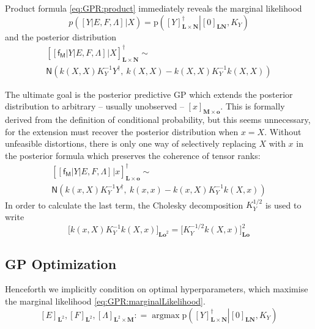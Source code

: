\documentclass[preprint,12pt]{elsarticle}
\newcommand*{\M}[1]{\ensuremath{#1}\xspace}
\newcommand*{\x}{\times}
\newcommand*{\mi}[1]{\mathbf{#1}}
\newcommand*{\rv}[1]{\mathsf{#1}}
\newcommand*{\te}[2][]{\left\lbrack{#2}\right\rbrack_{#1}}
\newcommand*{\tte}[2][]{\lbrack{#2}\rbrack_{#1}}
\newcommand*{\prob}[3]{\M{\mathrm{p}\!\left(\left.{#1}\right\vert{#2,#3}\right)}}
\newcommand*{\deq}{\M{\mathrel{\mathop:}=}}
\newcommand*{\gauss}[2]{\mathsf{N}\!\left({#1,#2}\right)}
\DeclareMathOperator*{\argmax}{argmax}
\begin{document}
        Product formula \cref{eq:GPR:product} immediately reveals the marginal likelihood
        \begin{equation} \label{eq:GPR:marginalLikelihood}
            p\!\left(\te{Y \vert E,F,\Lambda} \big\vert X\right)
            = \prob{\te[\mi{L\x N}]{Y}^{\dagger}}{\te[\mi{LN}]{0}}{K_Y}
        \end{equation}
        and the posterior distribution
        \begin{multline*}
            \te[\mi{L\x N}]{\te{\rv{f_M} \vert Y \vert E,F,\Lambda} \big\vert X}^{\dagger} \sim \\
            \gauss{k(X,X) K_{Y}^{-1} Y^{\dagger}}{\ k(X,X) - k(X,X) K_{Y}^{-1} k(X,X)}
        \end{multline*}

        The ultimate goal is the posterior predictive GP which extends the posterior distribution to arbitrary -- usually unobserved -- $\te[\mi{M}\x\mi{o}]{x}$. This is formally derived from the definition of conditional probability, but this seems unnecessary, for the extension must recover the posterior distribution when $x=X$. Without unfeasible distortions, there is only one way of selectively replacing $X$ with $x$ in the posterior formula which preserves the coherence of tensor ranks:
        \begin{multline} \label{def:GPR:Predictive}
            \te[\mi{L\x o}]{\te{\rv{f_M} \vert Y \vert E,F,\Lambda} \big\vert x}^{\dagger} \sim \\
            \gauss{k(x,X) K_{Y}^{-1} Y^{\dagger}}{\ k(x,x) - k(x,X) K_{Y}^{-1} k(X,x)}
        \end{multline}
        In order to calculate the last term, the Cholesky decomposition $K_{Y}^{1/2}$ is used to write
        \begin{equation*}
            \tte[\mi{Lo}^{2}]{k(x,X) K_{Y}^{-1} k(X,x)} = \tte[\mi{Lo}]{K_{Y}^{-1/2} k(X,x)}^{2}
        \end{equation*}

    \subsection{GP Optimization} \label{sub:GPR:Optimization}
        Henceforth we implicitly condition on optimal hyperparameters, which maximise the marginal likelihood \cref{eq:GPR:marginalLikelihood}.
        \begin{equation} \label{eq:GPR:hyperparameters}
            \te[\mi{L}^{2}]{E},\te[\mi{L}^{2}]{F},\te[\mi{L}^{2}\x\mi{M}]{\Lambda} \deq \argmax \prob{\te[\mi{L\x N}]{Y}^{\dagger}}{\te[\mi{LN}]{0}}{K_Y}
        \end{equation}
\end{document}
